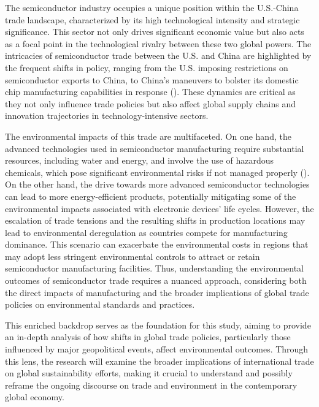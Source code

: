 The semiconductor industry occupies a unique position within the U.S.-China trade landscape, characterized by its high technological intensity and strategic significance. This sector not only drives significant economic value but also acts as a focal point in the technological rivalry between these two global powers. The intricacies of semiconductor trade between the U.S. and China are highlighted by the frequent shifts in policy, ranging from the U.S. imposing restrictions on semiconductor exports to China, to China's maneuvers to bolster its domestic chip manufacturing capabilities in response (). These dynamics are critical as they not only influence trade policies but also affect global supply chains and innovation trajectories in technology-intensive sectors.

The environmental impacts of this trade are multifaceted. On one hand, the advanced technologies used in semiconductor manufacturing require substantial resources, including water and energy, and involve the use of hazardous chemicals, which pose significant environmental risks if not managed properly (). On the other hand, the drive towards more advanced semiconductor technologies can lead to more energy-efficient products, potentially mitigating some of the environmental impacts associated with electronic devices' life cycles. However, the escalation of trade tensions and the resulting shifts in production locations may lead to environmental deregulation as countries compete for manufacturing dominance. This scenario can exacerbate the environmental costs in regions that may adopt less stringent environmental controls to attract or retain semiconductor manufacturing facilities. Thus, understanding the environmental outcomes of semiconductor trade requires a nuanced approach, considering both the direct impacts of manufacturing and the broader implications of global trade policies on environmental standards and practices.

This enriched backdrop serves as the foundation for this study, aiming to provide an in-depth analysis of how shifts in global trade policies, particularly those influenced by major geopolitical events, affect environmental outcomes. Through this lens, the research will examine the broader implications of international trade on global sustainability efforts, making it crucial to understand and possibly reframe the ongoing discourse on trade and environment in the contemporary global economy.

